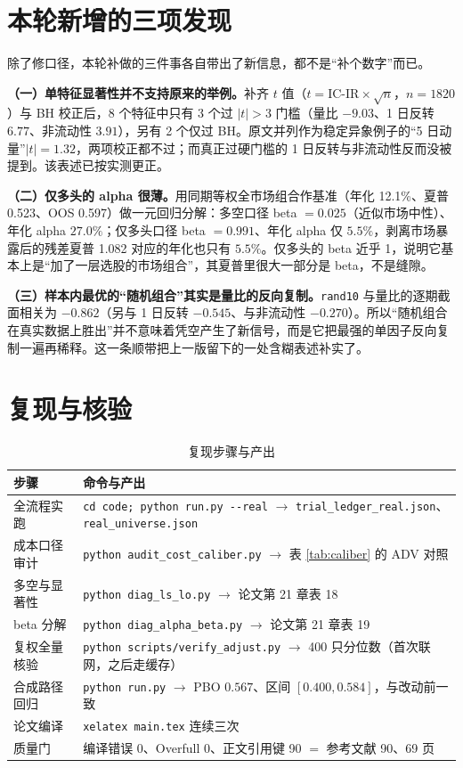 \documentclass[11pt,a4paper]{ctexart}
\begin{document}
\section{本轮新增的三项发现}

除了修口径，本轮补做的三件事各自带出了新信息，都不是“补个数字”而已。

\textbf{（一）单特征显著性并不支持原来的举例。}补齐 $t$ 值（$t=\text{IC-IR}\times\sqrt{n}$，$n=1820$）与 BH 校正后，8 个特征中只有 3 个过 $|t|>3$ 门槛（量比 $-9.03$、1 日反转 $6.77$、非流动性 $3.91$），另有 2 个仅过 BH。原文并列作为稳定异象例子的“5 日动量”$|t|=1.32$，两项校正都不过；而真正过硬门槛的 1 日反转与非流动性反而没被提到。该表述已按实测更正。

\textbf{（二）仅多头的 alpha 很薄。}用同期等权全市场组合作基准（年化 12.1\%、夏普 0.523、OOS 0.597）做一元回归分解：多空口径 beta $=0.025$（近似市场中性）、年化 alpha $27.0\%$；仅多头口径 beta $=0.991$、年化 alpha 仅 $5.5\%$，剥离市场暴露后的残差夏普 1.082 对应的年化也只有 $5.5\%$。仅多头的 beta 近乎 1，说明它基本上是“加了一层选股的市场组合”，其夏普里很大一部分是 beta，不是缝隙。

\textbf{（三）样本内最优的“随机组合”其实是量比的反向复制。}\texttt{rand10} 与量比的逐期截面相关为 $-0.862$（另与 1 日反转 $-0.545$、与非流动性 $-0.270$）。所以“随机组合在真实数据上胜出”并不意味着凭空产生了新信号，而是它把最强的单因子反向复制一遍再稀释。这一条顺带把上一版留下的一处含糊表述补实了。

\section{复现与核验}

\begin{table}[htbp]
\centering
\caption{复现步骤与产出}
\label{tab:repro}
\begin{tabular}{@{}>{\raggedright\arraybackslash}p{5.6cm}>{\raggedright\arraybackslash}p{8.8cm}@{}}
\toprule
步骤 & 命令与产出 \\
\midrule
全流程实跑 & \texttt{cd code; python run.py {-}{-}real} $\rightarrow$ \texttt{trial\_ledger\_real.json}、\texttt{real\_universe.json} \\
成本口径审计 & \texttt{python audit\_cost\_caliber.py} $\rightarrow$ 表 \ref{tab:caliber} 的 ADV 对照 \\
多空与显著性 & \texttt{python diag\_ls\_lo.py} $\rightarrow$ 论文第 21 章表 18 \\
beta 分解 & \texttt{python diag\_alpha\_beta.py} $\rightarrow$ 论文第 21 章表 19 \\
复权全量核验 & \texttt{python scripts/verify\_adjust.py} $\rightarrow$ 400 只分位数（首次联网，之后走缓存） \\
合成路径回归 & \texttt{python run.py} $\rightarrow$ PBO $0.567$、区间 $[0.400,0.584]$，与改动前一致 \\
论文编译 & \texttt{xelatex main.tex} 连续三次 \\
质量门 & 编译错误 0、Overfull 0、正文引用键 90 $=$ 参考文献 90、69 页 \\
\bottomrule
\end{tabular}
\end{table}
\end{document}

